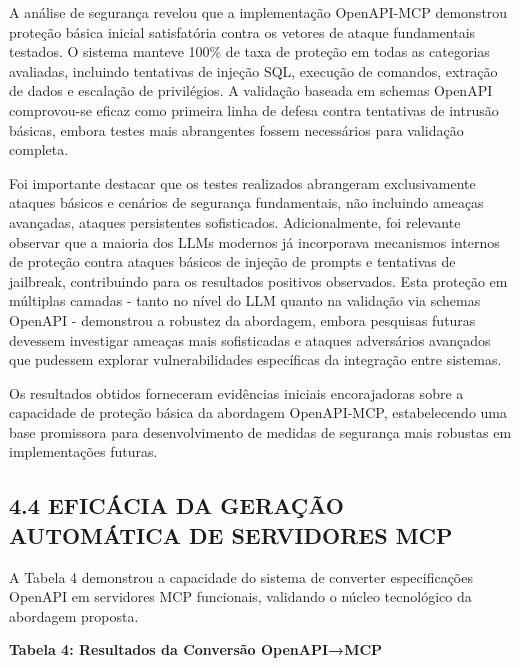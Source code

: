 \documentclass[
]{article}
\begin{document}
A análise de segurança revelou que a implementação OpenAPI-MCP
demonstrou proteção básica inicial satisfatória contra os vetores de
ataque fundamentais testados. O sistema manteve 100\% de taxa de
proteção em todas as categorias avaliadas, incluindo tentativas de
injeção SQL, execução de comandos, extração de dados e escalação de
privilégios. A validação baseada em schemas OpenAPI comprovou-se eficaz
como primeira linha de defesa contra tentativas de intrusão básicas,
embora testes mais abrangentes fossem necessários para validação
completa.

Foi importante destacar que os testes realizados abrangeram
exclusivamente ataques básicos e cenários de segurança fundamentais, não
incluindo ameaças avançadas, ataques persistentes sofisticados.
Adicionalmente, foi relevante observar que a maioria dos LLMs modernos
já incorporava mecanismos internos de proteção contra ataques básicos de
injeção de prompts e tentativas de jailbreak, contribuindo para os
resultados positivos observados. Esta proteção em múltiplas camadas -
tanto no nível do LLM quanto na validação via schemas OpenAPI -
demonstrou a robustez da abordagem, embora pesquisas futuras devessem
investigar ameaças mais sofisticadas e ataques adversários avançados que
pudessem explorar vulnerabilidades específicas da integração entre
sistemas.

Os resultados obtidos forneceram evidências iniciais encorajadoras sobre
a capacidade de proteção básica da abordagem OpenAPI-MCP, estabelecendo
uma base promissora para desenvolvimento de medidas de segurança mais
robustas em implementações futuras.

\subsection{4.4 EFICÁCIA DA GERAÇÃO AUTOMÁTICA DE SERVIDORES
MCP}\label{eficuxe1cia-da-gerauxe7uxe3o-automuxe1tica-de-servidores-mcp}

A Tabela 4 demonstrou a capacidade do sistema de converter
especificações OpenAPI em servidores MCP funcionais, validando o núcleo
tecnológico da abordagem proposta.

\textbf{Tabela 4: Resultados da Conversão OpenAPI→MCP}
\end{document}

